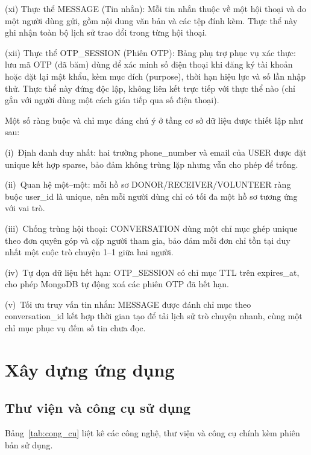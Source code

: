 \documentclass[../main.tex]{subfiles}%
\begin{document}
(xi) Thực thể MESSAGE (Tin nhắn): Mỗi tin nhắn thuộc về một hội thoại và do một người dùng gửi, gồm nội dung văn bản và các tệp đính kèm. Thực thể này ghi nhận toàn bộ lịch sử trao đổi trong từng hội thoại.

(xii) Thực thể OTP\_SESSION (Phiên OTP): Bảng phụ trợ phục vụ xác thực: lưu mã OTP (đã băm) dùng để xác minh số điện thoại khi đăng ký tài khoản hoặc đặt lại mật khẩu, kèm mục đích (purpose), thời hạn hiệu lực và số lần nhập thử. Thực thể này đứng độc lập, không liên kết trực tiếp với thực thể nào (chỉ gắn với người dùng một cách gián tiếp qua số điện thoại).

Một số ràng buộc và chỉ mục đáng chú ý ở tầng cơ sở dữ liệu được thiết lập như sau:

(i)~Định danh duy nhất: hai trường phone\_number và email của USER được đặt unique kết hợp sparse, bảo đảm không trùng lặp nhưng vẫn cho phép để trống. 

(ii)~Quan hệ một--một: mỗi hồ sơ DONOR/RECEIVER/VOLUNTEER ràng buộc user\_id là unique, nên mỗi người dùng chỉ có tối đa một hồ sơ tương ứng với vai trò. 

(iii)~Chống trùng hội thoại: CONVERSATION dùng một chỉ mục ghép unique theo đơn quyên góp và cặp người tham gia, bảo đảm mỗi đơn chỉ tồn tại duy nhất một cuộc trò chuyện 1--1 giữa hai người. 

(iv)~Tự dọn dữ liệu hết hạn: OTP\_SESSION có chỉ mục TTL trên expires\_at, cho phép MongoDB tự động xoá các phiên OTP đã hết hạn. 

(v)~Tối ưu truy vấn tin nhắn: MESSAGE được đánh chỉ mục theo conversation\_id kết hợp thời gian tạo để tải lịch sử trò chuyện nhanh, cùng một chỉ mục phục vụ đếm số tin chưa đọc.

\section{Xây dựng ứng dụng}
\label{section:4.3}

\subsection{Thư viện và công cụ sử dụng}
\label{subsection:4.3.1}

Bảng~\ref{tab:cong_cu} liệt kê các công nghệ, thư viện và công cụ chính kèm phiên bản sử dụng.
\end{document}
